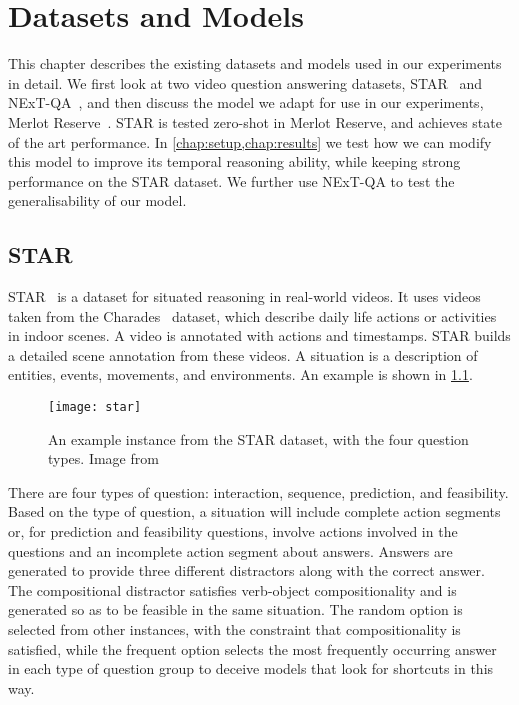 \chapter{Datasets and Models}
\label{chap:dataset}

This chapter describes the existing datasets and models used in our experiments
in detail.  We first look at two video question answering datasets,
STAR~\citep{wu2021star} and NExT-QA~\citep{xiao2021nextqa}, and then discuss the
model we adapt for use in our experiments, Merlot
Reserve~\citep{zellers2022mreserve}. STAR is tested zero-shot in Merlot Reserve,
and achieves state of the art performance. In \cref{chap:setup,chap:results}
we test how we can modify this model to improve its temporal reasoning ability,
while keeping strong performance on the STAR dataset. We further use NExT-QA to
test the generalisability of our model.

\section{STAR}
\label{sec:star}

STAR~\citep{wu2021star} is a dataset for situated reasoning in real-world videos.
It uses videos taken from the Charades~\citep{sigurdsson2016charades} dataset,
which describe daily life actions or activities in indoor scenes. A video
is annotated with actions and timestamps. STAR builds a detailed scene annotation
from these videos. A situation is a description of entities, events, movements,
and environments. An example is shown in \cref{fig:star}.

\begin{figure}[tp]
	\centering
	\texttt{[image: star]}
	\caption{An example instance from the STAR dataset, with the four question
		types. Image from~\citet{wu2021star}}
	\label{fig:star}
\end{figure}

There are four types of question: interaction, sequence, prediction, and
feasibility.  Based on the type of question, a situation will include complete
action segments or, for prediction and feasibility questions, involve actions
involved in the questions and an incomplete action segment about answers.
Answers are generated to provide three different distractors along with the
correct answer. The compositional distractor satisfies verb-object
compositionality and is generated so as to be feasible in the same situation.
The random option is selected from other instances, with the constraint that
compositionality is satisfied, while the frequent option selects the most
frequently occurring answer in each type of question group to deceive models
that look for shortcuts in this way.

